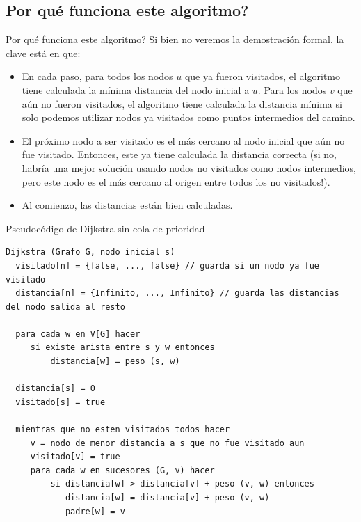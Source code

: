 \documentclass[compress]{beamer}
\begin{document}
\subsection{\textquestiondown Por qué funciona este algoritmo?}
\begin{frame}{\textquestiondown Por qué funciona este algoritmo?}
Si bien no veremos la demostración formal, la clave está en que:

\begin{itemize}
\item En cada paso, para todos los nodos $u$ que ya fueron visitados,
el algoritmo tiene calculada la mínima distancia del nodo inicial a $u$.
Para los nodos $v$ que aún no fueron visitados, el algoritmo tiene calculada
la distancia mínima si solo podemos utilizar nodos ya visitados como puntos
intermedios del camino.
\item El próximo nodo a ser visitado es el más cercano al nodo inicial
que aún no fue visitado. Entonces, este ya tiene calculada la distancia
correcta (si no, habría una mejor solución usando nodos no visitados como
nodos intermedios, pero este nodo es el más cercano al origen entre todos los
no visitados!).
\item Al comienzo, las distancias están bien calculadas.
\end{itemize}

\end{frame}

\begin{frame}[fragile]{Pseudocódigo de Dijkstra sin cola de prioridad}
\begin{lstlisting}
Dijkstra (Grafo G, nodo inicial s)
  visitado[n] = {false, ..., false} // guarda si un nodo ya fue visitado
  distancia[n] = {Infinito, ..., Infinito} // guarda las distancias del nodo salida al resto
  
  para cada w en V[G] hacer
     si existe arista entre s y w entonces
         distancia[w] = peso (s, w)

  distancia[s] = 0
  visitado[s] = true
  
  mientras que no esten visitados todos hacer 
     v = nodo de menor distancia a s que no fue visitado aun
     visitado[v] = true
     para cada w en sucesores (G, v) hacer
         si distancia[w] > distancia[v] + peso (v, w) entonces
            distancia[w] = distancia[v] + peso (v, w)
            padre[w] = v

\end{lstlisting}
\end{frame}
\end{document}
